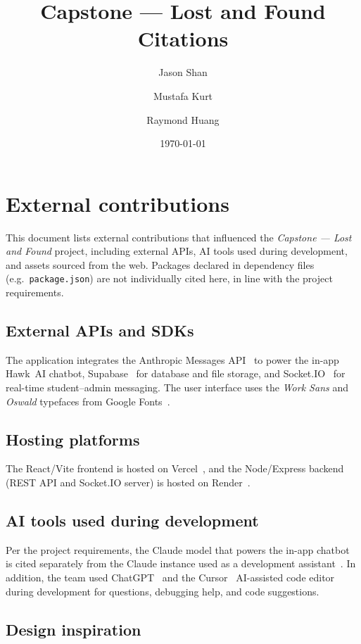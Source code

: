 \documentclass[11pt]{article}
\title{Capstone --- Lost and Found\\\large Citations}
\author{Jason Shan \and Mustafa Kurt \and Raymond Huang}
\date{\today}
\begin{document}
\maketitle

\section*{External contributions}

This document lists external contributions that influenced the
\emph{Capstone --- Lost and Found} project, including external APIs,
AI tools used during development, and assets sourced from the web.
Packages declared in dependency files (e.g.\ \texttt{package.json}) are
not individually cited here, in line with the project requirements.

\subsection*{External APIs and SDKs}

The application integrates the Anthropic Messages
API~\cite{anthropic_api} to power the in-app Hawk~AI chatbot,
Supabase~\cite{supabase} for database and file storage, and
Socket.IO~\cite{socketio} for real-time student--admin messaging.
The user interface uses the \emph{Work Sans} and \emph{Oswald}
typefaces from Google Fonts~\cite{googlefonts}.

\subsection*{Hosting platforms}

The React/Vite frontend is hosted on Vercel~\cite{vercel}, and the
Node/Express backend (REST API and Socket.IO server) is hosted on
Render~\cite{render}.

\subsection*{AI tools used during development}

Per the project requirements, the Claude model that powers the in-app
chatbot~\cite{ai_claude_chatbot} is cited separately from the Claude
instance used as a development assistant~\cite{ai_claude_assistant}.
In addition, the team used ChatGPT~\cite{ai_chatgpt} and the
Cursor~\cite{ai_cursor} AI-assisted code editor during development for
questions, debugging help, and code suggestions.

\subsection*{Design inspiration}
\end{document}
